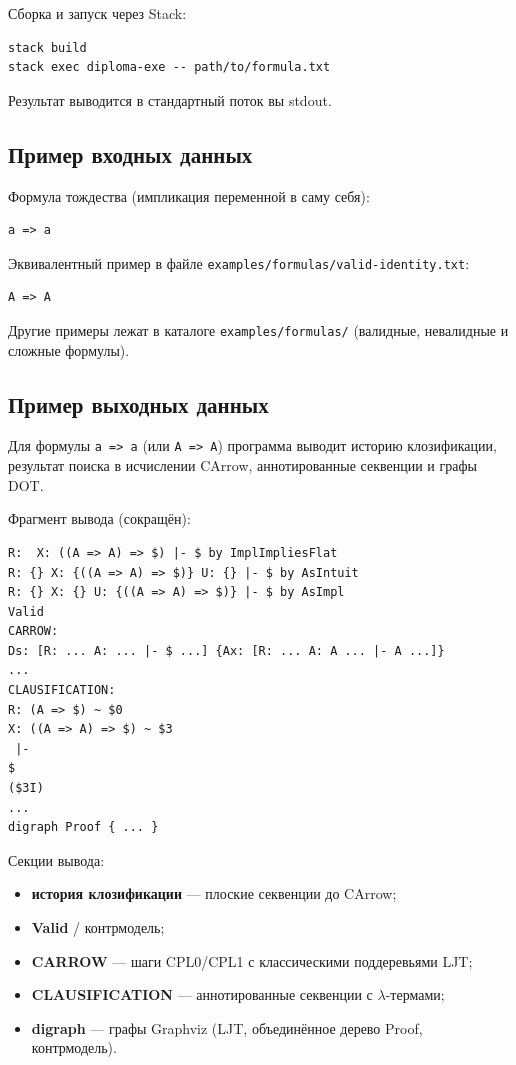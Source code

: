 \documentclass[a4paper,12pt]{article}
\begin{document}
Сборка и запуск через Stack:
\begin{lstlisting}[caption={Сборка и запуск программы},label={lst:stack-run}]
stack build
stack exec diploma-exe -- path/to/formula.txt
\end{lstlisting}

Результат выводится в стандартный поток вы stdout.

\subsection{Пример входных данных}

Формула тождества (импликация переменной в саму себя):
\begin{lstlisting}[style=formula,caption={Пример входной формулы: \texttt{a => a}},label={lst:input-a}]
a => a
\end{lstlisting}

Эквивалентный пример в файле \verb|examples/formulas/valid-identity.txt|:
\begin{lstlisting}[style=formula,caption={Файл \texttt{valid-identity.txt}},label={lst:input-A}]
A => A
\end{lstlisting}

Другие примеры лежат в каталоге \verb|examples/formulas/| (валидные, невалидные
и сложные формулы).

\subsection{Пример выходных данных}

Для формулы \verb|a => a| (или \verb|A => A|) программа выводит историю клозификации, результат
поиска в исчислении CArrow, аннотированные секвенции и графы DOT.

Фрагмент вывода (сокращён):
\begin{lstlisting}[caption={Фрагмент вывода для \texttt{A => A} (сокращён)},label={lst:output-identity}]
R:  X: ((A => A) => $) |- $ by ImplImpliesFlat
R: {} X: {((A => A) => $)} U: {} |- $ by AsIntuit
R: {} X: {} U: {((A => A) => $)} |- $ by AsImpl
Valid
CARROW:
Ds: [R: ... A: ... |- $ ...] {Ax: [R: ... A: A ... |- A ...]}
...
CLAUSIFICATION:
R: (A => $) ~ $0
X: ((A => A) => $) ~ $3
 |-
$
($3I)
...
digraph Proof { ... }
\end{lstlisting}

Секции вывода:
\begin{itemize}
  \item \textbf{история клозификации} --- плоские секвенции до CArrow;
  \item \textbf{Valid} / контрмодель;
  \item \textbf{CARROW} --- шаги CPL0/CPL1 с классическими поддеревьями LJT;
  \item \textbf{CLAUSIFICATION} --- аннотированные секвенции с $\lambda$-термами;
  \item \textbf{digraph} --- графы Graphviz (LJT, объединённое дерево Proof,
        контрмодель).
\end{itemize}
\end{document}
